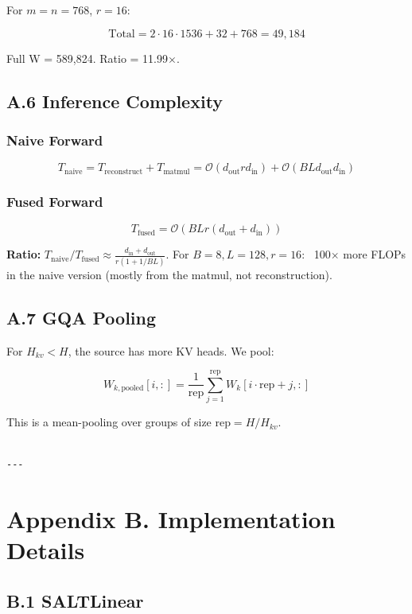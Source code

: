 For $m = n = 768$, $r = 16$:

\[
\text{Total} = 2 \cdot 16 \cdot 1536 + 32 + 768 = 49,184
\tag{A.4}
\]

Full W = 589,824. Ratio = 11.99$\times$.

\subsection{A.6 Inference Complexity}

\subsubsection{Naive Forward}

\[
T_\text{naive} = T_\text{reconstruct} + T_\text{matmul} = \mathcal{O}(d_\text{out} r d_\text{in}) + \mathcal{O}(BL d_\text{out} d_\text{in})
\tag{A.5}
\]

\subsubsection{Fused Forward}

\[
T_\text{fused} = \mathcal{O}(BL r (d_\text{out} + d_\text{in}))
\tag{A.6}
\]

\textbf{Ratio:} $T_\text{naive} / T_\text{fused} \approx \frac{d_\text{in} + d_\text{out}}{r (1 + 1/BL)}$. 
For $B = 8, L = 128, r = 16$: ~100$\times$ more FLOPs in the naive version (mostly 
from the matmul, not reconstruction).

\subsection{A.7 GQA Pooling}

For $H_{kv} < H$, the source has more KV heads. We pool:

\[
W_{k,\text{pooled}}[i, :] = \frac{1}{\text{rep}} \sum_{j=1}^{\text{rep}} W_{k}[i \cdot \text{rep} + j, :]
\tag{A.7}
\]

This is a mean-pooling over groups of size $\text{rep} = H / H_{kv}$.
\begin{lstlisting}

---
\end{lstlisting}


\section{Appendix B. Implementation Details}

\subsection{B.1 SALTLinear}


